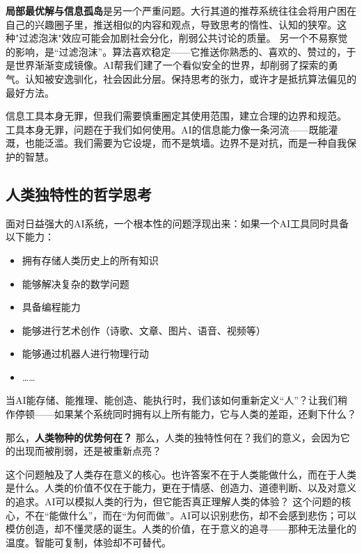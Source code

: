 {\bf 局部最优解与信息孤岛}是另一个严重问题。大行其道的推荐系统往往会将用户困在自己的兴趣圈子里，推送相似的内容和观点，导致思考的惰性、认知的狭窄。这种"过滤泡沫"效应可能会加剧社会分化，削弱公共讨论的质量。
另一个不易察觉的影响，是“过滤泡沫”。算法喜欢稳定——它推送你熟悉的、喜欢的、赞过的，于是世界渐渐变成镜像。AI帮我们建了一个看似安全的世界，却削弱了探索的勇气。认知被安逸驯化，社会因此分层。保持思考的张力，或许才是抵抗算法偏见的最好方法。

信息工具本身无罪，但我们需要慎重圈定其使用范围，建立合理的边界和规范。
工具本身无罪，问题在于我们如何使用。AI的信息能力像一条河流——既能灌溉，也能泛滥。我们需要为它设堤，而不是筑墙。边界不是对抗，而是一种自我保护的智慧。

\subsection{人类独特性的哲学思考}

面对日益强大的AI系统，一个根本性的问题浮现出来：如果一个AI工具同时具备以下能力：

\begin{itemize}
\item 拥有存储人类历史上的所有知识
\item 能够解决复杂的数学问题
\item 具备编程能力
\item 能够进行艺术创作（诗歌、文章、图片、语音、视频等）
\item 能够通过机器人进行物理行动
\item ……
\end{itemize}
当AI能存储、能推理、能创造、能执行时，我们该如何重新定义“人”？让我们稍作停顿——如果某个系统同时拥有以上所有能力，它与人类的差距，还剩下什么？

那么，{\bf 人类物种的优势何在？}
那么，人类的独特性何在？我们的意义，会因为它的出现而被削弱，还是被重新点亮？

这个问题触及了人类存在意义的核心。也许答案不在于人类能做什么，而在于人类是什么。人类的价值不仅在于能力，更在于情感、创造力、道德判断、以及对意义的追求。AI可以模拟人类的行为，但它能否真正理解人类的体验？
这个问题的核心，不在“能做什么”，而在“为何而做”。AI可以识别悲伤，却不会感到悲伤；可以模仿创造，却不懂灵感的诞生。人类的价值，在于意义的追寻——那种无法量化的温度。智能可复制，体验却不可替代。

